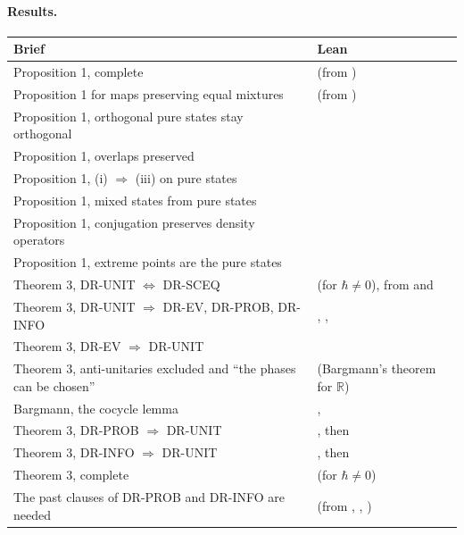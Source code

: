 \documentclass[11pt]{article}
\begin{document}
\paragraph{Results.}
\begin{center}
\begin{tabularx}{\textwidth}{@{}BL@{}}
\toprule
Brief & Lean \\
\midrule
Proposition 1, complete &  (from
  ) \\
Proposition 1 for maps preserving equal mixtures &
   (from
  ) \\
Proposition 1, orthogonal pure states stay orthogonal &  \\
Proposition 1, overlaps preserved &  \\
Proposition 1, (i) $\Rightarrow$ (iii) on pure states &
   \\
Proposition 1, mixed states from pure states &  \\
Proposition 1, conjugation preserves density operators &  \\
Proposition 1, extreme points are the pure states &  \\
Theorem 3, DR-UNIT $\Leftrightarrow$ DR-SCEQ &  (for $\hbar \ne 0$), from
   and
   \\
Theorem 3, DR-UNIT $\Rightarrow$ DR-EV, DR-PROB, DR-INFO & ,
  ,  \\
Theorem 3, DR-EV $\Rightarrow$ DR-UNIT &  \\
Theorem 3, anti-unitaries excluded and ``the phases can be chosen'' &
   (Bargmann's theorem for $\mathbb{R}$) \\
Bargmann, the cocycle lemma & ,
   \\
Theorem 3, DR-PROB $\Rightarrow$ DR-UNIT & , then  \\
Theorem 3, DR-INFO $\Rightarrow$ DR-UNIT & , then  \\
Theorem 3, complete &  (for $\hbar \ne 0$) \\
The past clauses of DR-PROB and DR-INFO are needed & 
  (from , ,
  ) \\
\bottomrule
\end{tabularx}
\end{center}
\end{document}
